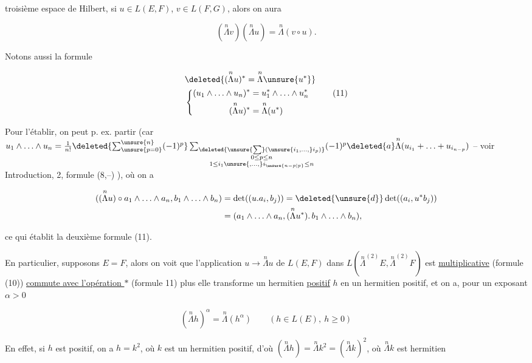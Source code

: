 troisième espace de Hilbert, si $u\in L(E,F)$, $v\in L(F,G)$, alors on aura

\[
(\overset{n}{\Lambda}v)(\overset{n}{\Lambda}u)=\overset{n}{\Lambda}(v\circ u).\tag*{(10)}
\]

Notons aussi la formule

\[
\begin{aligned}
&\deleted{(\overset{n}{\Lambda}u)^*=\overset{n}{\Lambda}\unsure{u^*}}\\
&\left\{\begin{aligned}
(u_1\wedge\ldots\wedge u_n)^*&=u_1^*\wedge\ldots\wedge u_n^*\\
(\overset{n}{\Lambda}u)^*&=\overset{n}{\Lambda}(u^*)
\end{aligned}\right.
\end{aligned}\tag*{(11)}
\]


Pour l'établir, on peut p. ex.   partir  (car $u_1\wedge\ldots\wedge u_n=\frac1{n!}\deleted{\sum_{\unsure{p=0}}^{\unsure{n}}(-1)^p}\sum_{\substack{\deleted{\unsure{\sum}(\unsure{i_1,\ldots,}i_p)}\\0\leq p\leq n\\1\leq i_1\unsure{,\ldots,}i_{\unsure{n-p|p}}\leq n}}(-1)^p\deleted{a}\overset{n}{\Lambda}(u_{i_1}+\ldots+u_{i_{n-p}})$ -- voir Introduction, 2, formule (8,--) ), où on a

\[
\begin{aligned}
((\overset{n}{\Lambda}u)\circ a_1\wedge\ldots\wedge a_n,b_1\wedge\ldots\wedge b_n)&=\det((u.a_i,b_j))=\deleted{\unsure{d}}\det((a_i,u^*b_j))\\
&=(a_1\wedge\ldots\wedge a_n,(\overset{n}{\Lambda}u^*).\,b_1\wedge\ldots\wedge b_n),
\end{aligned}
\]

ce qui établit  la deuxième formule (11).

En particulier, supposons $E=F$, alors on voit que l'application $u\longrightarrow\overset{n}{\Lambda}u$ de $L(E,F)$ dans $L(\overset{n}{\Lambda}^{(2)}E,\overset{n}{\Lambda}^{(2)}F)$ est \uline{multiplicative} (formule (10)) \uline{commute avec l'opération $*$} (formule 11)   plus elle transforme  un hermitien \uline{positif} $h$ en un hermitien positif, et on a, pour  un exposant  $\alpha>0$

\[
(\overset{n}{\Lambda}h)^\alpha=\overset{n}{\Lambda}(h^\alpha)\qquad(h\in L(E),\ h\geq0)\tag*{(12)}
\]

En effet, si $h$ est positif, on a $h=k^2$, où $k$ est un hermitien positif, d'où $(\overset{n}{\Lambda}h)=\overset{n}{\Lambda}k^2=(\overset{n}{\Lambda}k)^2$, où $\overset{n}{\Lambda}k$ est hermitien 
